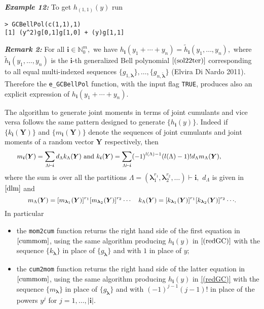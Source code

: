 \hskip-0.5cm\textbf{\emph{Example 12:}} To get \(h_{(1,1)}(y)\) run

\begin{verbatim}
> GCBellPol(c(1,1),1)
[1] (y^2)g[0,1]g[1,0] + (y)g[1,1]
\end{verbatim}

\hskip-0.5cm\textbf{\emph{Remark 2:}} For all \(\boldsymbol{i} \in {\mathbb N}_0^m,\) we have \(h_{\boldsymbol{i}}(y_1 + \cdots + y_n)= \tilde{h}_{\boldsymbol{i}}(y_1, \ldots, y_n),\) where \(\tilde{h}_{\boldsymbol{i}}(y_1, \ldots, y_n)\) is the \(\boldsymbol{i}\)-th generalized Bell polynomial \(\eqref{(sol22ter)}\) corresponding to all equal multi-indexed sequences \(\{ g_{1, \boldsymbol{\lambda}}\}, \ldots, \{ g_{n, \boldsymbol{\tilde{\lambda}}}\}\) (Elvira Di Nardo 2011). Therefore the \texttt{e\_GCBellPol} function, with the input flag \texttt{TRUE}, produces also an explicit expression of \(h_{\boldsymbol{i}}(y_1 + \cdots + y_n).\)

The algorithm to generate joint moments in terms of joint cumulants and vice versa follows the same pattern designed to generate \(\{h_{\boldsymbol{i}}(y)\}.\) Indeed if \(\{k_{\boldsymbol{i}}(\boldsymbol{Y})\}\) and \(\{m_{\boldsymbol{i}}(\boldsymbol{Y})\}\) denote the sequences of joint cumulants and joint moments of a random vector \(\boldsymbol{Y}\) respectively, then
\begin{equation}\label{cummom}
\hskip-1.3cm{\small m_{\boldsymbol{i}}(\boldsymbol{Y}) = \sum_{{\Lambda} \vdash  \boldsymbol{i}} d_{\Lambda} k_{\Lambda}(\boldsymbol{Y}) \,\,  \hbox{and} \,\, k_{\boldsymbol{i}}(\boldsymbol{Y}) = \sum_{{\Lambda} \vdash  \boldsymbol{i}} (-1)^{l(\Lambda)-1} (l(\Lambda)-1)! d_{\Lambda} m_{\Lambda}(\boldsymbol{Y})},
\end{equation}
where the sum is over all the partitions \(\Lambda=(\boldsymbol{\lambda}_1^{r_1} , \boldsymbol{\lambda}_2^{r_2}, \ldots) \vdash \boldsymbol{i},\) \(d_{\Lambda}\) is given in \(\eqref{dlm}\) and
\[{\small m_{\Lambda}(\boldsymbol{Y})= [m_{{\boldsymbol{\lambda}}_1}(\boldsymbol{Y})]^{r_1} [m_{{\boldsymbol{\lambda}}_2}(\boldsymbol{Y})]^{r_2} \cdots \quad k_{\Lambda}(\boldsymbol{Y})= [k_{{\boldsymbol{\lambda}}_1}(\boldsymbol{Y})]^{r_1} [k_{{\boldsymbol{\lambda}}_2}(\boldsymbol{Y})]^{r_2} \cdots}.\]
In particular

\begin{itemize}
\item
  the \texttt{mom2cum} function returns the right hand side of the first equation in \(\eqref{cummom}\), using the same algorithm producing \(h_{\boldsymbol{i}}(y)\) in \(\eqref{(redGC)}\) with the sequence \(\{k_{\boldsymbol{\lambda}}\}\) in place of \(\{g_{\boldsymbol{\lambda}}\}\) and with \(1\) in place of \(y;\)
\item
  the \texttt{cum2mom} function returns the right hand side of the latter equation in \(\eqref{cummom}\), using the same algorithm producing \(h_{\boldsymbol{i}}(y)\) in \eqref{(redGC)} with the sequence \(\{m_{\boldsymbol{\lambda}}\}\) in place of \(\{g_{\boldsymbol{\lambda}}\}\) and with \((-1)^{j-1} (j-1)!\) in place of the powers \(y^j\) for \(j=1,\ldots,|\boldsymbol{i}|.\)
\end{itemize}

